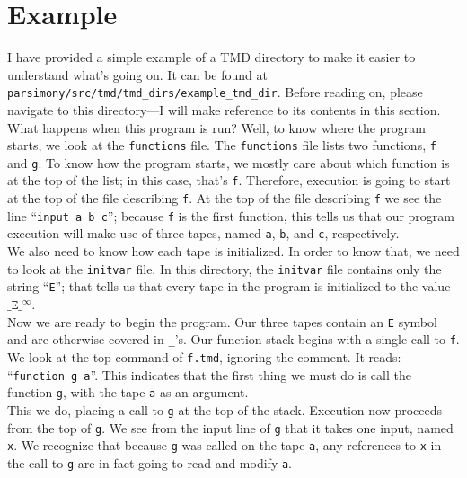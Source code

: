 \documentclass[11pt]{article}
\begin{document}
\section{Example}

I have provided a simple example of a TMD directory to make it easier to understand what's going on. It can be found at \texttt{parsimony/src/tmd/tmd\_dirs/example\_tmd\_dir}. Before reading on, please navigate to this directory---I will make reference to its contents in this section. \\

What happens when this program is run? Well, to know where the program starts, we look at the \texttt{functions} file. The \texttt{functions} file lists two functions, \texttt{f} and \texttt{g}. To know how the program starts, we mostly care about which function is at the top of the list; in this case, that's \texttt{f}. Therefore, execution is going to start at the top of the file describing \texttt{f}. At the top of the file describing \texttt{f} we see the line ``\texttt{input a b c}''; because \texttt{f} is the first function, this tells us that our program execution will make use of three tapes, named \texttt{a}, \texttt{b}, and \texttt{c}, respectively. \\

We also need to know how each tape is initialized. In order to know that, we need to look at the \texttt{initvar} file. In this directory, the \texttt{initvar} file contains only the string ``\texttt{E}''; that tells us that every tape in the program is initialized to the value $\texttt{\_E\_}^\infty$. \\

Now we are ready to begin the program. Our three tapes contain an \texttt{E} symbol and are otherwise covered in \texttt{\_}'s. Our function stack begins with a single call to \texttt{f}. We look at the top command of \texttt{f.tmd}, ignoring the comment. It reads: ``\texttt{function g a}''. This indicates that the first thing we must do is call the function \texttt{g}, with the tape \texttt{a} as an argument. \\

This we do, placing a call to \texttt{g} at the top of the stack. Execution now proceeds from the top of \texttt{g}. We see from the input line of \texttt{g} that it takes one input, named \texttt{x}. We recognize that because \texttt{g} was called on the tape \texttt{a}, any references to \texttt{x} in the call to \texttt{g} are in fact going to read and modify \texttt{a}. \\
\end{document}
